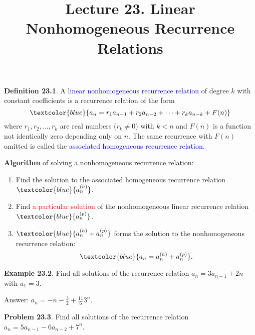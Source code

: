 \documentclass[aspectratio=169]{beamer}
\title{Lecture 23. Linear Nonhomogeneous Recurrence Relations}
\date{ }
\providecommand{\Blue}[1]{\textcolor{blue}{#1}}
\providecommand{\Red}[1]{\textcolor{red}{#1}}
\begin{document}
\frame[plain]{\titlepage}



\begin{frame}[plain]{}

 {\bf  Definition 23.1}. A \Blue{linear nonhomogeneous recurrence relation}
   of degree $k$ with constant coefficients is a recurrence relation of the form 
   \[ \Blue{ a_n = r_1a_{n-1} + r_{2}a_{n-2}+\cdots + r_ka_{n-k} + F(n) } 
   \]
   where $r_1, r_2, ..., r_k$ are real numbers  ($r_k\neq 0$) with $k<n$
    and $F(n)$ is a function not identically zero depending only on $n$.
    The same recurrence with
 $F(n)$ omitted is called the \Blue{associated homogeneous recurrence relation}.
 \medskip
 \pause
 
  {\bf Algorithm} of solving a nonhomogeneous recurrence relation:
  
 \begin{enumerate}
  \item Find the solution to the associated homogeneous recurrence relation $\Blue{a_n^{(h)} }$.
  \item Find \Red{a particular solution} of the nonhomogeneous linear recurrence relation $\Blue{a_n^{(p)} }$. 
  \item $\Blue{a_n^{(h)}+a_n^{(p)} }$ forms the solution to the nonhomogeneous recurrence relation:
       \[ \Blue{a_n = a_n^{(h)}+a_n^{(p)} }. 
       \]
  \end{enumerate}

 
\end{frame}

\begin{frame}[plain]{}

 {\bf Example 23.2}. Find all solutions of the recurrence relation $a_n = 3a_{n-1} + 2n$ with $a_1=3$.
 \smallskip
 \pause
 
 Answer: $a_n = -n-\frac{3}{2}+\frac{11}{6}3^n$.
 
 \medskip
 
 {\bf Problem 23.3}. Find all solutions of the recurrence relation $a_n = 5a_{n-1}-6a_{n-2}+7^n$.

 \vspace{1.2in}
 
\end{frame}
\end{document}
